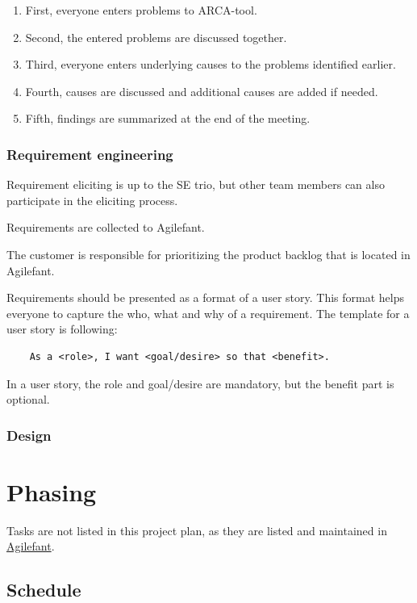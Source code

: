 \begin{enumerate}
\item First, everyone enters problems to ARCA-tool.
\item Second, the entered problems are discussed together.
\item Third, everyone enters underlying causes to the problems identified earlier.
\item Fourth, causes are discussed and additional causes are added if needed.
\item Fifth, findings are summarized at the end of the meeting.
\end{enumerate}

\subsubsection{Requirement engineering}

Requirement eliciting is up to the SE trio, but other team members can also 
participate in the eliciting process.

Requirements are collected to Agilefant. 

The customer is responsible for prioritizing the product backlog that is located 
in Agilefant.

Requirements should be presented as a format of a user story. This format helps 
everyone to capture the who, what and why of a requirement. The template for a 
user story is following:

\begin{verbatim}
    As a <role>, I want <goal/desire> so that <benefit>.
\end{verbatim}

In a user story, the role and goal/desire are mandatory, but the benefit part is 
optional.

\subsubsection{Design}



\section{Phasing}

Tasks are not listed in this project plan, as they are listed and maintained in 
\href{https://cloud.agilefant.com/dev/}{Agilefant}.

\subsection{Schedule}

